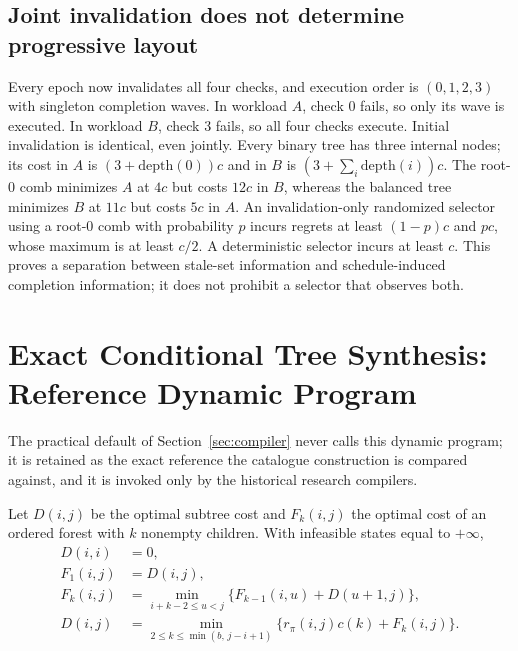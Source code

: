 \subsection{Joint invalidation does not determine progressive layout}
Every epoch now invalidates all four checks, and execution order is $(0,1,2,3)$
with singleton completion waves. In workload $A$, check 0 fails, so only its wave
is executed. In workload $B$, check 3 fails, so all four checks execute. Initial
invalidation is identical, even jointly. Every binary tree has three internal
nodes; its cost in $A$ is $(3+\mathrm{depth}(0))c$ and in $B$ is
$(3+\sum_i\mathrm{depth}(i))c$. The root-0 comb minimizes $A$ at $4c$ but costs
$12c$ in $B$, whereas the balanced tree minimizes $B$ at $11c$ but costs $5c$ in
$A$. An invalidation-only randomized selector using a root-0 comb with probability
$p$ incurs regrets at least $(1-p)c$ and $pc$, whose maximum is at least $c/2$. A
deterministic selector incurs at least $c$. This proves a separation between
stale-set information and schedule-induced completion information; it does not
prohibit a selector that observes both.

\section{Exact Conditional Tree Synthesis: Reference Dynamic Program}\label{app:exactdp}
The practical default of Section~\ref{sec:compiler} never calls this dynamic
program; it is retained as the exact reference the catalogue construction is
compared against, and it is invoked only by the historical research compilers.

Let $D(i,j)$ be the optimal subtree cost and $F_k(i,j)$ the optimal cost of an
ordered forest with $k$ nonempty children. With infeasible states equal to
$+\infty$,
\begin{align}
D(i,i)&=0,\label{eq:Dbase}\\
F_1(i,j)&=D(i,j),\label{eq:F1}\\
F_k(i,j)&=\min_{i+k-2\le u<j}\bigl\{F_{k-1}(i,u)+D(u+1,j)\bigr\},\label{eq:Forest}\\
D(i,j)&=\min_{2\le k\le\min(b,\,j-i+1)}\bigl\{r_\pi(i,j)c(k)+F_k(i,j)\bigr\}.\label{eq:D}
\end{align}

